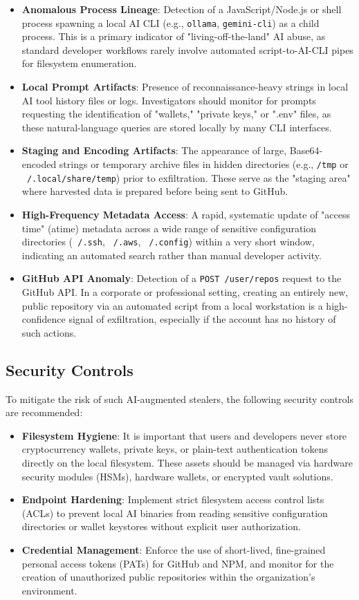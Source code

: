 \documentclass[11pt,a4paper]{article}
\newcommand{\techterm}[1]{\texttt{#1}}
\begin{document}
\begin{itemize}
    \item \textbf{Anomalous Process Lineage}: Detection of a JavaScript/Node.js or shell process spawning a local AI CLI (e.g., \techterm{ollama}, \techterm{gemini-cli}) as a child process. This is a primary indicator of "living-off-the-land" AI abuse, as standard developer workflows rarely involve automated script-to-AI-CLI pipes for filesystem enumeration.
    \item \textbf{Local Prompt Artifacts}: Presence of reconnaissance-heavy strings in local AI tool history files or logs. Investigators should monitor for prompts requesting the identification of "wallets," "private keys," or ".env" files, as these natural-language queries are stored locally by many CLI interfaces.
    \item \textbf{Staging and Encoding Artifacts}: The appearance of large, Base64-encoded strings or temporary archive files in hidden directories (e.g., \techterm{/tmp} or \techterm{~/.local/share/temp}) prior to exfiltration. These serve as the "staging area" where harvested data is prepared before being sent to GitHub.
    \item \textbf{High-Frequency Metadata Access}: A rapid, systematic update of "access time" (atime) metadata across a wide range of sensitive configuration directories (\techterm{~/.ssh}, \techterm{~/.aws}, \techterm{~/.config}) within a very short window, indicating an automated search rather than manual developer activity.
    \item \textbf{GitHub API Anomaly}: Detection of a \techterm{POST /user/repos} request to the GitHub API. In a corporate or professional setting, creating an entirely new, public repository via an automated script from a local workstation is a high-confidence signal of exfiltration, especially if the account has no history of such actions.
\end{itemize}


\subsection{Security Controls}
To mitigate the risk of such AI-augmented stealers, the following security controls are recommended:
\begin{itemize}
    \item \textbf{Filesystem Hygiene}: It is important that users and developers never store cryptocurrency wallets, private keys, or plain-text authentication tokens directly on the local filesystem. These assets should be managed via hardware security modules (HSMs), hardware wallets, or encrypted vault solutions.
    \item \textbf{Endpoint Hardening}: Implement strict filesystem access control lists (ACLs) to prevent local AI binaries from reading sensitive configuration directories or wallet keystores without explicit user authorization.
    \item \textbf{Credential Management}: Enforce the use of short-lived, fine-grained personal access tokens (PATs) for GitHub and NPM, and monitor for the creation of unauthorized public repositories within the organization's environment.
\end{itemize}
\end{document}
